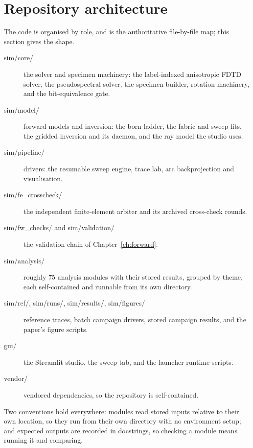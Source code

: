 \section{Repository architecture}

The code is organised by role, and  is the
authoritative file-by-file map; this section gives the shape.

\begin{description}
  \item[sim/core/] the solver and specimen machinery: the
    label-indexed anisotropic FDTD solver, the pseudospectral
    solver, the specimen builder, rotation machinery, and the
    bit-equivalence gate.
  \item[sim/model/] forward models and inversion: the born ladder,
    the fabric and sweep fits, the gridded inversion and its daemon,
    and the ray model the studio uses.
  \item[sim/pipeline/] drivers: the resumable sweep engine, trace
    lab, arc backprojection and visualisation.
  \item[sim/fe\_crosscheck/] the independent finite-element arbiter
    and its archived cross-check rounds.
  \item[sim/fw\_checks/ and sim/validation/] the validation chain of
    Chapter~\ref{ch:forward}.
  \item[sim/analysis/] roughly 75 analysis modules with their stored
    results, grouped by theme, each self-contained and runnable from
    its own directory.
  \item[sim/ref/, sim/runs/, sim/results/, sim/figures/] reference
    traces, batch campaign drivers, stored campaign results, and the
    paper's figure scripts.
  \item[gui/] the Streamlit studio, the sweep tab, and the launcher
    runtime scripts.
  \item[vendor/] vendored dependencies, so the repository is
    self-contained.
\end{description}

Two conventions hold everywhere: modules read stored inputs relative
to their own location, so they run from their own directory with no
environment setup; and expected outputs are recorded in docstrings,
so checking a module means running it and comparing.
